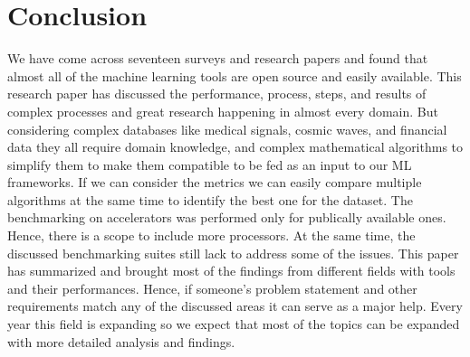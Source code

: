 \documentclass[a4paper,UKenglish,cleveref, autoref, thm-restate]{lipics-v2021}
\begin{document}
\section{Conclusion}
\label{conclusion}
We have come across seventeen surveys and research papers and found that almost all of the machine learning tools are open source and easily available. This research paper has discussed the performance, process, steps, and results of complex processes and great research happening in almost every domain. But considering complex databases like medical signals, cosmic waves, and financial data they all require domain knowledge, and complex mathematical algorithms to simplify them to make them compatible to be fed as an input to our ML frameworks. If we can consider the metrics we can easily compare multiple algorithms at the same time to identify the best one for the dataset. The benchmarking on accelerators was performed only for publically available ones. Hence, there is a scope to include more processors. At the same time, the discussed benchmarking suites still lack to address some of the issues. This paper has summarized and brought most of the findings from different fields with tools and their performances. Hence, if someone's problem statement and other requirements match any of the discussed areas it can serve as a major help. Every year this field is expanding so we expect that most of the topics can be expanded with more detailed analysis and findings.











\appendix
\end{document}
